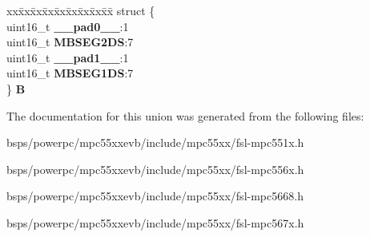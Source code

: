 \begin{DoxyCompactItemize}
\begin{tabbing}
\end{tabbing}\item 
\mbox{\label{unionuMBDSR_ac7f32680429846fb44e75ffcb76faab1}} 
\begin{tabbing}
xx\=xx\=xx\=xx\=xx\=xx\=xx\=xx\=xx\=\kill
struct \{\\
\>uint16\_t {\bfseries \_\_pad0\_\_}:1\\
\>uint16\_t {\bfseries MBSEG2DS}:7\\
\>uint16\_t {\bfseries \_\_pad1\_\_}:1\\
\>uint16\_t {\bfseries MBSEG1DS}:7\\
\} {\bfseries B}\\

\end{tabbing}\end{DoxyCompactItemize}


The documentation for this union was generated from the following files\+:\begin{DoxyCompactItemize}
\item 
bsps/powerpc/mpc55xxevb/include/mpc55xx/fsl-\/mpc551x.\+h\item 
bsps/powerpc/mpc55xxevb/include/mpc55xx/fsl-\/mpc556x.\+h\item 
bsps/powerpc/mpc55xxevb/include/mpc55xx/fsl-\/mpc5668.\+h\item 
bsps/powerpc/mpc55xxevb/include/mpc55xx/fsl-\/mpc567x.\+h\end{DoxyCompactItemize}
